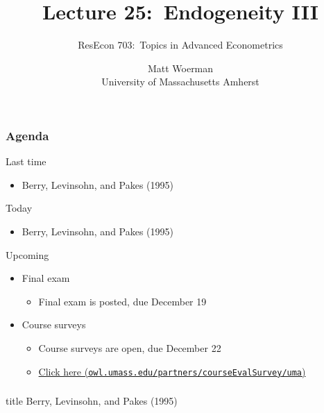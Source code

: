 \documentclass{beamer}
\title[Lecture 25:\ Endogeneity III]{Lecture 25:\ Endogeneity III}
\author[ResEcon 703:\ Advanced Econometrics]{ResEcon 703:\ Topics in Advanced Econometrics}
\date{Matt Woerman\\University of Massachusetts Amherst}
\begin{document}
{ 
\begin{frame}[noframenumbering]
    \titlepage
\end{frame}
}

\begin{frame}\frametitle{Agenda}
    Last time
    \begin{itemize}
        \item Berry, Levinsohn, and Pakes (1995)
    \end{itemize}
    \vspace{2ex}
    Today
    \begin{itemize}
        \item Berry, Levinsohn, and Pakes (1995)
    \end{itemize}
    \vspace{2ex}
    Upcoming
    \begin{itemize}
        \item Final exam
        \begin{itemize}
        	\item Final exam is posted, due December 19
        \end{itemize}
        \item Course surveys
        \begin{itemize}
            \item Course surveys are open, due December 22
            \item \href{http://owl.umass.edu/partners/courseEvalSurvey/uma/}{Click here (\texttt{owl.umass.edu/partners/courseEvalSurvey/uma})}
        \end{itemize}
    \end{itemize}
\end{frame}

\begin{frame}\frametitle{}
    \vfill
    \centering
    \begin{beamercolorbox}[center]{title}
        \Large Berry, Levinsohn, and Pakes (1995)
    \end{beamercolorbox}
    \vfill
\end{frame}
\end{document}
